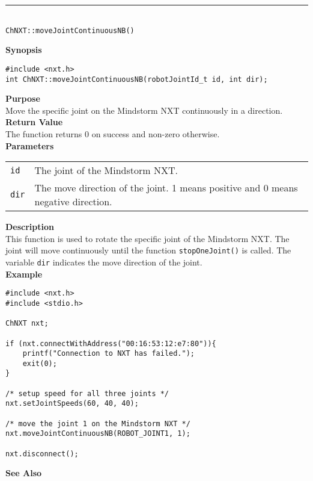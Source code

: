 \noindent
\vspace{5pt}
\rule{4.5in}{0.015in}\\
\noindent
{\LARGE \texttt{ChNXT::moveJointContinuousNB()} }\\


\noindent
{\bf Synopsis}
\vspace{-8pt}
\begin{verbatim}
#include <nxt.h>
int ChNXT::moveJointContinuousNB(robotJointId_t id, int dir);
\end{verbatim}

\noindent
{\bf Purpose}\\
Move the specific joint on the Mindstorm NXT continuously in a direction.\\

\noindent
{\bf Return Value}\\
The function returns 0 on success and non-zero otherwise.\\

\noindent
{\bf Parameters}\\
\vspace{-0.1in}
\begin{description}
\item               
\begin{tabular}{p{15 mm}p{125 mm}}
\texttt{id}      &The joint of the Mindstorm NXT.\\
\texttt{dir}     &The move direction of the joint. 1 means positive and 0 means negative direction.\\
\end{tabular}
\end{description}

\noindent
{\bf Description}\\
This function is used to rotate the specific joint of the Mindstorm NXT. The joint will move continuously until the function 
\texttt{stopOneJoint()} is called. The variable \texttt{dir} indicates the move direction of the joint. \\


\noindent
{\bf Example}
\begin{verbatim}
#include <nxt.h> 
#include <stdio.h>

ChNXT nxt;

if (nxt.connectWithAddress("00:16:53:12:e7:80")){
    printf("Connection to NXT has failed.");
    exit(0);
}
 
/* setup speed for all three joints */
nxt.setJointSpeeds(60, 40, 40);

/* move the joint 1 on the Mindstorm NXT */
nxt.moveJointContinuousNB(ROBOT_JOINT1, 1);

nxt.disconnect();
\end{verbatim}

\noindent
{\bf See Also}\\
